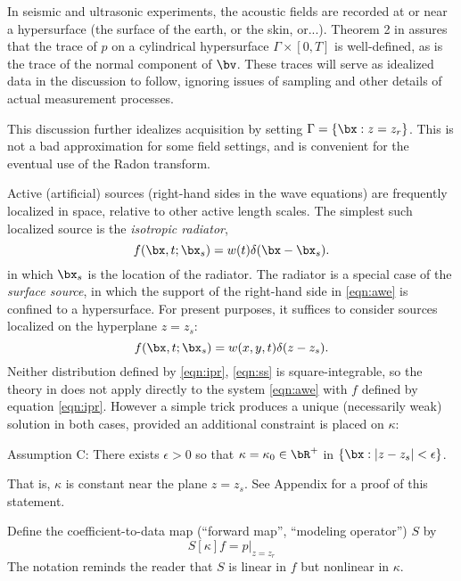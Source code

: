 In seismic and ultrasonic experiments, the acoustic
fields are recorded at or near a hypersurface (the surface of the
earth, or the skin, or...). Theorem 2 in \cite[]{BlazekStolkSymes:13}
assures that the trace of $p$ on a cylindrical hypersurface $\Gamma
\times [0,T]$ is well-defined, as is the trace of the normal component
of $\bv$. These traces will serve as idealized data in the discussion
to follow, ignoring issues of sampling and other details of actual
measurement processes. 

This discussion further idealizes acquisition by setting $\Gamma =
\{\bx: z=z_r\}$. This is not a bad approximation for some field
settings, and is convenient for the eventual use of the Radon
transform.

Active (artificial) sources (right-hand sides in the wave equations)
are frequently localized in space, relative to other active length scales. The
simplest such localized source is the {\em isotropic radiator},
\begin{equation}
  \label{eqn:ipr}
  f(\bx,t;\bx_s) = w(t)\delta(\bx-\bx_s).  
\end{equation} 
in which $\bx_s$ is the location of the radiator. The radiator is a
special case of the {\em surface source}, in which the support of the
right-hand side in \ref{eqn:awe} is confined to a hypersurface. For
present purposes, it suffices to consider sources localized on the
hyperplane $z=z_s$:
\begin{equation}
  \label{eqn:ss}
  f(\bx,t;\bx_s) = w(x,y,t)\delta(z-z_s). 
\end{equation}
Neither distribution defined by \ref{eqn:ipr}, \ref{eqn:ss} is 
square-integrable, so the theory in \cite[]{BlazekStolkSymes:13} does
not apply directly to the system \ref{eqn:awe} with $f$ defined by
equation \ref{eqn:ipr}. However a simple trick produces a unique
(necessarily weak) solution in both cases, provided an additional
constraint is placed on $\kappa$:

\indent Assumption C: There exists $\epsilon >0$ so that $\kappa =
\kappa_0 \in \bR^+$ in $\{\bx: |z-z_s|<\epsilon\}$.

\noindent That is, $\kappa$ is constant near the plane $z=z_s$. See
Appendix \appSingular for a proof of this statement.

Define the coefficient-to-data map (``forward map'', ``modeling
operator'') $S$ by
\begin{equation}
\label{eqn:fwd}
S[\kappa]f = p|_{z=z_r}
\end{equation}
The notation reminds the reader that $S$ is linear in $f$ but
nonlinear in $\kappa$.

